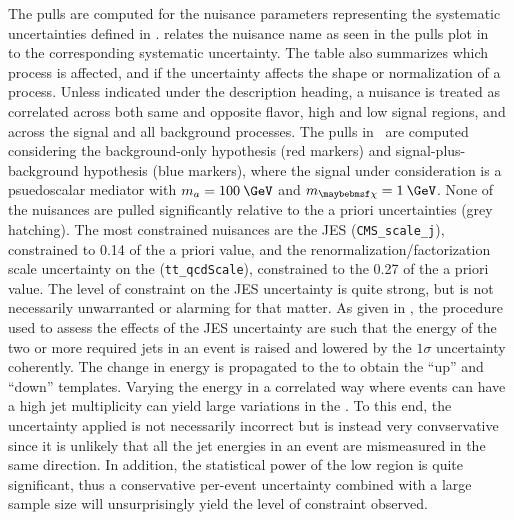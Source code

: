 The pulls are computed for the nuisance parameters representing the systematic uncertainties defined in .  relates the nuisance name as seen in the pulls plot in~ to the corresponding systematic uncertainty. The table also summarizes which process is affected, and if the uncertainty affects the shape or normalization of a process. Unless indicated under the description heading, a nuisance is treated as correlated across both same and opposite flavor, high and low \mttll signal regions, and across the signal and all background processes. The pulls in~ are computed considering the background-only hypothesis (red markers) and signal-plus-background hypothesis (blue markers), where the signal under consideration is a psuedoscalar mediator with $m_a=100\:\GeV$ and $\mDM=1\:\GeV$. None of the nuisances are pulled significantly relative to the a priori uncertainties (grey hatching). The most constrained nuisances are the JES (\texttt{CMS\_scale\_j}), constrained to 0.14 of the a priori value, and the renormalization/factorization scale uncertainty on the \ttll (\texttt{tt\_qcdScale}), constrained to the 0.27 of the a priori value. The level of constraint on the JES uncertainty is quite strong, but is not necessarily unwarranted or alarming for that matter. As given in , the procedure used to assess the effects of the JES uncertainty are such that the energy of the two or more required jets in an event is raised and lowered by the $1\sigma$ uncertainty coherently. The change in energy is propagated to the \MET to obtain the ``up'' and ``down'' \MET templates. Varying the energy in a correlated way where events can have a high jet multiplicity can yield large variations in the \MET. To this end, the uncertainty applied is not necessarily incorrect but is instead very convservative since it is unlikely that all the jet energies in an event are mismeasured in the same direction. In addition, the statistical power of the low \mttll region is quite significant, thus a conservative per-event uncertainty combined with a large sample size will unsurprisingly yield the level of constraint observed.

